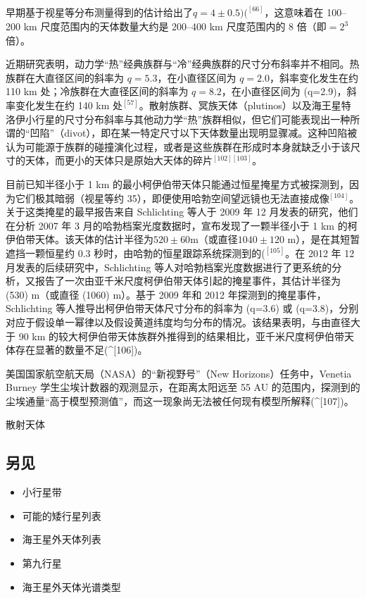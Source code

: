 早期基于视星等分布测量得到的估计给出了$q=4\pm0.5)(^{[66]}$，这意味着在 100–200 km 尺度范围内的天体数量大约是 200–400 km 尺度范围内的 8 倍（即$=2^{3}$ 倍）。

近期研究表明，动力学“热”经典族群与“冷”经典族群的尺寸分布斜率并不相同。热族群在大直径区间的斜率为 $q=5.3$，在小直径区间为 $q=2.0$，斜率变化发生在约 110 km 处；冷族群在大直径区间的斜率为 $q=8.2$，在小直径区间为 (q=2.9)，斜率变化发生在约 140 km 处$^{[57]}$。散射族群、冥族天体（plutinos）以及海王星特洛伊小行星的尺寸分布斜率与其他动力学“热”族群相似，但它们可能表现出一种所谓的“凹陷”（divot），即在某一特定尺寸以下天体数量出现明显骤减。这种凹陷被认为可能源于族群的碰撞演化过程，或者是这些族群在形成时本身就缺乏小于该尺寸的天体，而更小的天体只是原始大天体的碎片$^{[102][103]}$。

目前已知半径小于 1 km 的最小柯伊伯带天体只能通过恒星掩星方式被探测到，因为它们极其暗弱（视星等约 35），即便使用哈勃空间望远镜也无法直接成像$^{[104]}$。关于这类掩星的最早报告来自 Schlichting 等人于 2009 年 12 月发表的研究，他们在分析 2007 年 3 月的哈勃档案光度数据时，宣布发现了一颗半径小于 1 km 的柯伊伯带天体。该天体的估计半径为$520\pm60$m（或直径$1040\pm120$ m），是在其短暂遮挡一颗恒星约 0.3 秒时，由哈勃的恒星跟踪系统探测到的($^{[105]}$。在 2012 年 12 月发表的后续研究中，Schlichting 等人对哈勃档案光度数据进行了更系统的分析，又报告了一次由亚千米尺度柯伊伯带天体引起的掩星事件，其估计半径为 (530) m（或直径 (1060) m）。基于 2009 年和 2012 年探测到的掩星事件，Schlichting 等人推导出柯伊伯带天体尺寸分布的斜率为 (q=3.6) 或 (q=3.8)，分别对应于假设单一幂律以及假设黄道纬度均匀分布的情况。该结果表明，与由直径大于 90 km 的较大柯伊伯带天体族群外推得到的结果相比，亚千米尺度柯伊伯带天体存在显著的数量不足(^{[106]})。

美国国家航空航天局（NASA）的“新视野号”（New Horizons）任务中，Venetia Burney 学生尘埃计数器的观测显示，在距离太阳远至 55 AU 的范围内，探测到的尘埃通量“高于模型预测值”，而这一现象尚无法被任何现有模型所解释(^{[107]})。

散射天体



\subsection{另见}
\begin{itemize}
\item 小行星带
\item 可能的矮行星列表
\item 海王星外天体列表
\item 第九行星
\item 海王星外天体光谱类型
\end{itemize}
